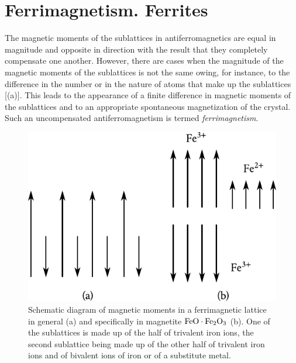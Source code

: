 \section{Ferrimagnetism. Ferrites}\label{sec:70}

The magnetic moments of the sublattices in antiferromagnetics are equal in magnitude and opposite in direction with the result that they completely compensate one another. However, there are cases when the magnitude of the magnetic moments of the sublattices is not the same owing, for instance, to the difference in the number or in the nature of atoms that make up the sublattices [(a)]. This leads to the appearance of a finite difference in magnetic moments of the sublattices and to an appropriate spontaneous magnetization of the crystal. Such an uncompensated antiferromagnetism is termed \textit{ferrimagnetism}.

\begin{figure}[t]
	\begin{center}
		\includegraphics[scale=1]{figures/ch_07/fig_7_23.pdf}
		\caption[]{Schematic diagram of magnetic moments in a ferrimagnetic lattice in general (a) and specifically in magnetite $\ce{FeO}\cdot\ce{Fe2O3}$ (b). One of the sublattices is made up of the half of trivalent iron ions, the second sublattice being made up of the other half of trivalent iron ions and of bivalent ions of iron or of a substitute metal.}
		\label{fig:7_23}
	\end{center}
	\vspace{-0.8cm}
\end{figure}

